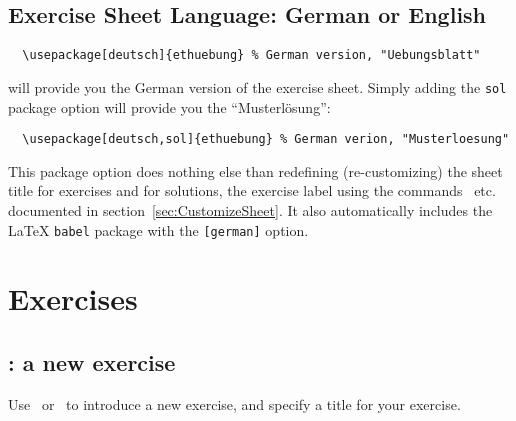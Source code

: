 \documentclass[11pt,a4paper]{article}
\begin{document}
\subsection{Exercise Sheet Language: German or English}
\label{sec:Language}

\begin{pkgverbatim}
\begin{verbatim}
  \usepackage[deutsch]{ethuebung} % German version, "Uebungsblatt"
\end{verbatim}
\end{pkgverbatim}
will provide you the German version of the exercise sheet. Simply adding the \texttt{sol}
package option will provide you the ``Musterl\"osung'':
\begin{pkgverbatim}
\begin{verbatim}
  \usepackage[deutsch,sol]{ethuebung} % German verion, "Musterloesung"
\end{verbatim}
\end{pkgverbatim}

\begin{pkgtip}
  This package option does nothing else than redefining (re-customizing) the sheet title
  for exercises and for solutions, the exercise label using the
  commands~ etc. documented in
  section~\ref{sec:CustomizeSheet}. It also automatically includes the \LaTeX{}
  \texttt{babel} package with the \texttt{[german]} option.
\end{pkgtip}




\section{Exercises}

\subsection{: a new exercise}

Use~ or~ to introduce a new exercise, and specify a
title for your exercise.

\end{document}
